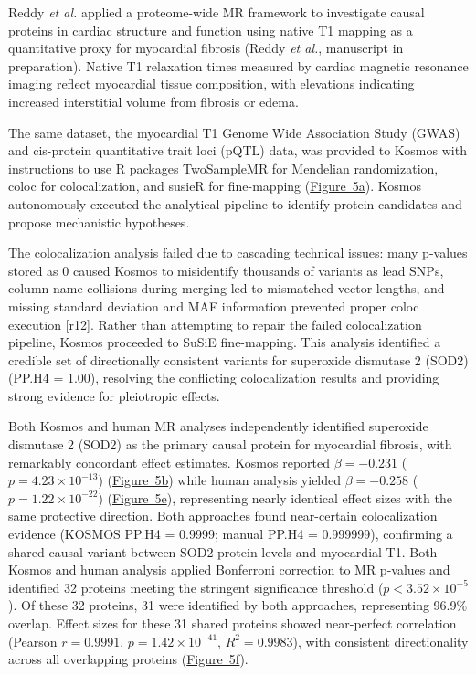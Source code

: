 \documentclass{article}
\begin{document}
Reddy \textit{et al.} applied a proteome-wide MR framework to investigate causal proteins in cardiac structure and function using native T1 mapping as a quantitative proxy for myocardial fibrosis (Reddy \textit{et al.}, manuscript in preparation). Native T1 relaxation times measured by cardiac magnetic resonance imaging reflect myocardial tissue composition, with elevations indicating increased interstitial volume from fibrosis or edema. 

The same dataset, the myocardial T1 Genome Wide Association Study (GWAS) and cis-protein quantitative trait loci (pQTL) data, was provided to Kosmos with instructions to use R packages TwoSampleMR for Mendelian randomization, coloc for colocalization, and susieR for fine-mapping (\hyperref[fig:fig5]{Figure~5a}). Kosmos autonomously executed the analytical pipeline to identify protein candidates and propose mechanistic hypotheses.

The colocalization analysis failed due to cascading technical issues: many p-values stored as 0 caused Kosmos to misidentify thousands of variants as lead SNPs, column name collisions during merging led to mismatched vector lengths, and missing standard deviation and MAF information prevented proper coloc execution [r12]. Rather than attempting to repair the failed colocalization pipeline, Kosmos proceeded to SuSiE fine-mapping. This analysis identified a credible set of directionally consistent variants for superoxide dismutase 2 (SOD2) (PP.H4 = 1.00), resolving the conflicting colocalization results and providing strong evidence for pleiotropic effects. 

Both Kosmos and human MR analyses independently identified superoxide dismutase 2 (SOD2) as the primary causal protein for myocardial fibrosis, with remarkably concordant effect estimates. Kosmos reported $\beta = -0.231$ ($p = 4.23 \times 10^{-13}$) (\hyperref[fig:fig5]{Figure~5b}) while human analysis yielded $\beta = -0.258$ ($p = 1.22 \times 10^{-22}$) (\hyperref[fig:fig5]{Figure~5e}), representing nearly identical effect sizes with the same protective direction. Both approaches found near-certain colocalization evidence (KOSMOS PP.H4 = 0.9999; manual PP.H4 = 0.999999), confirming a shared causal variant between SOD2 protein levels and myocardial T1. Both Kosmos and human analysis applied Bonferroni correction to MR p-values and identified 32 proteins meeting the stringent significance threshold ($p < 3.52 \times 10^{-5}$). Of these 32 proteins, 31 were identified by both approaches, representing 96.9\% overlap. Effect sizes for these 31 shared proteins showed near-perfect correlation (Pearson $r = 0.9991$, $p = 1.42 \times 10^{-41}$, $R^2 = 0.9983$), with consistent directionality across all overlapping proteins (\hyperref[fig:fig5]{Figure~5f}).
\end{document}

